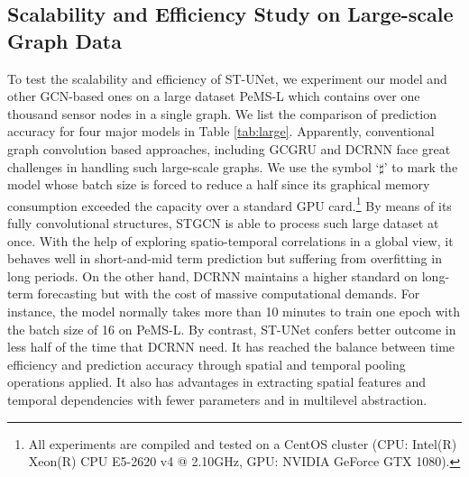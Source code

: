 \documentclass[sigconf,screen]{acmart}
\begin{document}
\begin{table}
\centering
\caption{\label{tab:ups}Comparison of different upsampling approaches in ST-Unpool in terms of MSE on PeMS-M (The notion `${\S}$' indicates that the test model may not converge eventually).}
\end{table}

\subsection{Scalability and Efficiency Study on Large-scale Graph Data}
To test the scalability and efficiency of ST-UNet, we experiment our model and other GCN-based ones on a large dataset PeMS-L which contains over one thousand sensor nodes in a single graph. We list the comparison of prediction accuracy for four major models in Table \ref{tab:large}. Apparently, conventional graph convolution based approaches, including GCGRU and DCRNN face great challenges in handling such large-scale graphs. We use the symbol `$\sharp$' to mark the model whose batch size is forced to reduce a half since its graphical memory consumption exceeded the capacity over a standard GPU card.\footnote{All experiments are compiled and tested on a CentOS cluster (CPU: Intel(R) Xeon(R) CPU E5-2620 v4 @ 2.10GHz, GPU: NVIDIA GeForce GTX 1080).} By means of its fully convolutional structures, STGCN is able to process such large dataset at once. With the help of exploring spatio-temporal correlations in a global view, it behaves well in short-and-mid term prediction but suffering from overfitting in long periods. On the other hand, DCRNN maintains a higher standard on long-term forecasting but with the cost of massive computational demands. For instance, the model normally takes more than 10 minutes to train one epoch with the batch size of 16 on PeMS-L. By contrast, ST-UNet confers better outcome in less half of the time that DCRNN need. It has reached the balance between time efficiency and prediction accuracy through spatial and temporal pooling operations applied. It also has advantages in extracting spatial features and temporal dependencies with fewer parameters and in multilevel abstraction.
\end{document}
